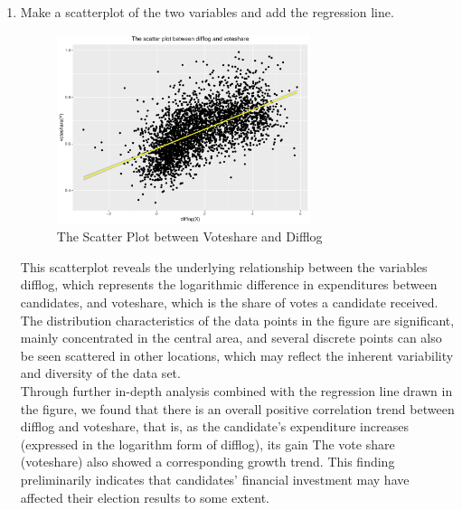 \documentclass[12pt,letterpaper]{article}
\begin{document}
\begin{enumerate}
		\item Make a scatterplot of the two variables and add the regression line. 
		
		\begin{figure}[h!]
			\caption{\footnotesize{The Scatter Plot between Voteshare and Difflog}}
			\vspace{.5cm}
			\centering
			\label{fig:1.2}
			\includegraphics[width=0.7\textwidth]{difflog_voteshare_scatterplot.pdf}
		\end{figure}
		
		This scatterplot reveals the underlying relationship between the variables difflog, which represents the logarithmic difference in expenditures between candidates, and voteshare, which is the share of votes a candidate received. The distribution characteristics of the data points in the figure are significant, mainly concentrated in the central area, and several discrete points can also be seen scattered in other locations, which may reflect the inherent variability and diversity of the data set.\\
		Through further in-depth analysis combined with the regression line drawn in the figure, we found that there is an overall positive correlation trend between difflog and voteshare, that is, as the candidate’s expenditure increases (expressed in the logarithm form of difflog), its gain The vote share (voteshare) also showed a corresponding growth trend. This finding preliminarily indicates that candidates’ financial investment may have affected their election results to some extent.\\
		

\end{enumerate}
\end{document}
